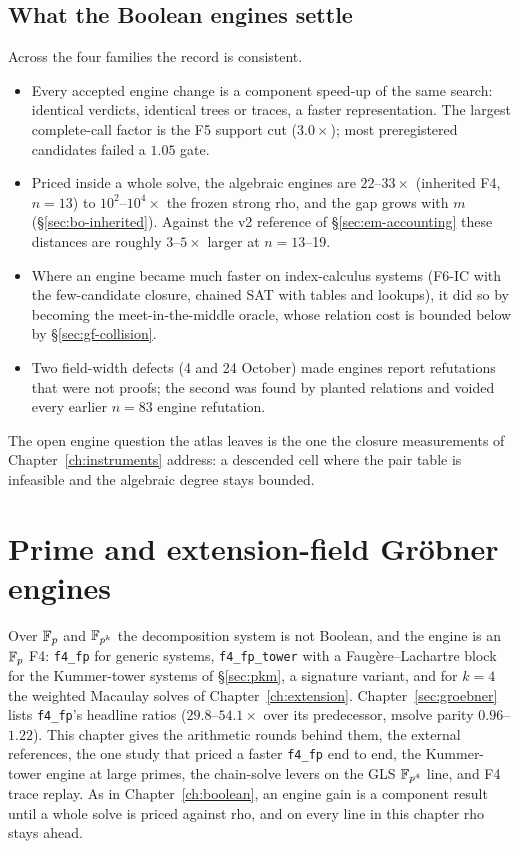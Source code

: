 \section{What the Boolean engines settle}\label{sec:bo-summary}

Across the four families the record is consistent.
\begin{itemize}
\item Every accepted engine change is a component speed-up of the same
  search: identical verdicts, identical trees or traces, a faster
  representation. The largest complete-call factor is the F5 support cut
  ($3.0\times$); most preregistered candidates failed a $1.05$ gate.
\item Priced inside a whole solve, the algebraic engines are $22$--$33\times$
  (inherited F4, $n=13$) to $10^2$--$10^4\times$ the frozen strong rho, and the
  gap grows with $m$ (\S\ref{sec:bo-inherited}). Against the v2 reference of
  \S\ref{sec:em-accounting} these distances are roughly $3$--$5\times$ larger
  at $n=13$--19.
\item Where an engine became much faster on index-calculus systems (F6-IC
  with the few-candidate closure, chained SAT with tables and lookups), it did
  so by becoming the meet-in-the-middle oracle, whose relation cost is
  bounded below by \S\ref{sec:gf-collision}.
\item Two field-width defects (4 and 24 October) made engines report
  refutations that were not proofs; the second was found by planted
  relations and voided every earlier $n=83$ engine refutation.
\end{itemize}
The open engine question the atlas leaves is the one the closure
measurements of Chapter~\ref{ch:instruments} address: a descended cell
where the pair table is infeasible and the algebraic degree stays bounded.
\chapter{Prime and extension-field Gr\"obner engines}\label{ch:fpengines}

Over $\mathbb{F}_p$ and $\mathbb{F}_{p^k}$ the decomposition system is not Boolean, and
the engine is an $\mathbb{F}_p$ F4: \texttt{f4\_fp} for generic systems,
\texttt{f4\_fp\_tower} with a Faug\`ere--Lachartre block for the
Kummer-tower systems of \S\ref{sec:pkm}, a signature variant, and for $k=4$
the weighted Macaulay solves of Chapter~\ref{ch:extension}.
Chapter~\ref{sec:groebner} lists \texttt{f4\_fp}'s headline ratios
($29.8$--$54.1\times$ over its predecessor, msolve parity $0.96$--$1.22$).
This chapter gives the arithmetic rounds behind them, the external
references, the one study that priced a faster \texttt{f4\_fp} end to end,
the Kummer-tower engine at large primes, the chain-solve levers on the GLS
$\mathbb{F}_{p^4}$ line, and F4 trace replay. As in Chapter~\ref{ch:boolean}, an
engine gain is a component result until a whole solve is priced against
rho, and on every line in this chapter rho stays ahead.

